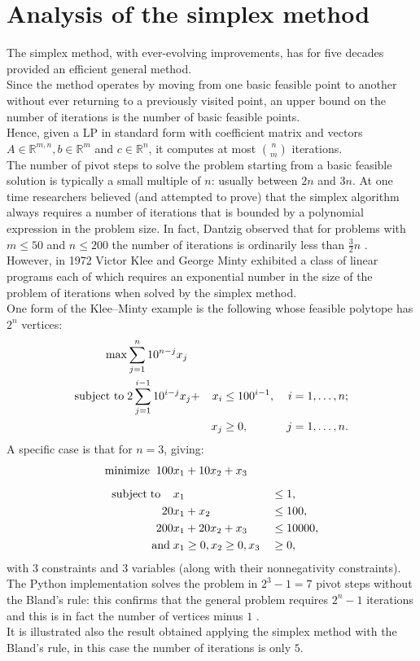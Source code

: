 \documentclass[a4paper,10 pt,titlepage,twoside]{book}
\theoremstyle{plain}
\theoremstyle{definition}
\theoremstyle{remark}
\begin{document}
 \section{Analysis of the simplex method}
The simplex method, with ever-evolving improvements, has for five decades provided an efficient general
method. \\
 Since the method operates by moving from one basic feasible point
to another without ever returning to a previously visited point, an upper bound
on the number of iterations is the number of basic feasible points.\\Hence, given a LP in standard form with
coefficient matrix and vectors $A\in\mathbb{R}^{m,n}, b\in\mathbb{R}^{m}$ and $c\in\mathbb{R}^{n}$, it computes at most $n\choose m$ iterations.\\
The number of pivot steps to solve
the problem starting from a basic feasible solution is typically a small multiple of
$n$: usually between $2n$ and $3n$. At one time researchers believed (and attempted to prove) that the simplex algorithm always requires a number of iterations that is
bounded by a polynomial expression in the problem size. In fact, Dantzig observed that for problems with
$m \leq 50$ and $n \leq 200$ the number of iterations is ordinarily less than $\frac{3}{2}n$ \cite{DAN}.
\\ However, in 1972 Victor Klee and George Minty exhibited a class of linear programs each of which requires an
exponential number in the size of the problem of iterations when solved by the simplex method.\\
One form of the Klee–Minty example is the following whose feasible polytope has $2^{n}$
vertices:
\begin{alignat*}{4}
\max &\sum_{j=1}^{n}10^{n-j}x_{j}&&&\\
\text{subject to\;}&2\sum_{j=1}^{i-1}10^{i-j}x_{j}+&x_{i}&\leq 100^{i-1}, \, &i = 1,\dots, n;\\
&&x_{j}&\geq 0, \,&j = 1,\dots, n.\\
\end{alignat*}
A specific case is that for $n = 3$, giving:
\begin{alignat*}{2}
\text{minimize\;}\; 100& x_1+10x_2+ x_3&&\\[2mm]
\text{subject\;to\;\;\;\;} &x_1&&\leq 1,\\
						20& x_1+x_2&&\leq 100,\\
200 &x_1 +20x_2 +x_{3}&&\leq 10000,\\
\text{and}\;& x_1\geq 0,x_2\geq 0,x_3&&\geq 0,
\end{alignat*}
with 3 constraints and 3 variables (along with their nonnegativity constraints).\\
The Python implementation solves the problem in $2^{3} - 1 = 7$ pivot steps without the Bland's rule: this confirms that the general problem requires $2^{n}- 1$ iterations and this is in fact
the number of vertices minus $1$ \cite{MINTY}.\\ It is illustrated also the result obtained applying the simplex method with the Bland's rule, in this case the number of iterations is only $5$.  \\
\end{document}
